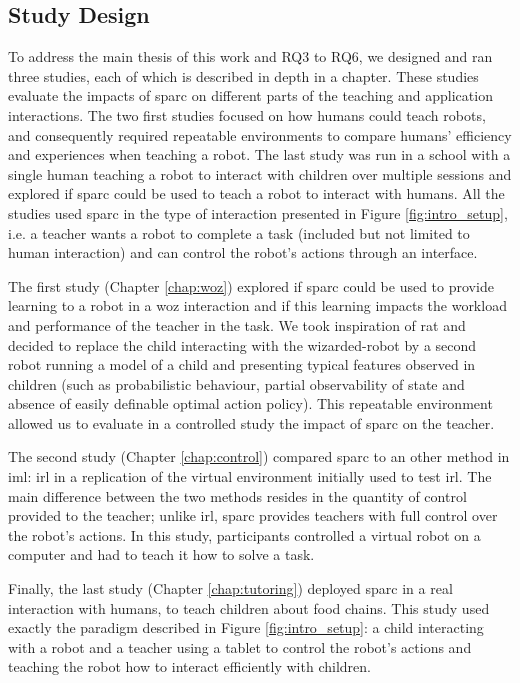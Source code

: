 \subsection{Study Design} 

To address the main thesis of this work and RQ3 to RQ6, we designed and ran three studies, each of which is described in depth in a chapter. These studies evaluate the impacts of \gls{sparc} on different parts of the teaching and application interactions. The two first studies focused on how humans could teach robots, and consequently required repeatable environments to compare humans' efficiency and experiences when teaching a robot. The last study was run in a school with a single human teaching a robot to interact with children over multiple sessions and explored if \gls{sparc} could be used to teach a robot to interact with humans. All the studies used \gls{sparc} in the type of interaction presented in Figure \ref{fig:intro_setup}, i.e. a teacher wants a robot to complete a task (included but not limited to human interaction) and can control the robot's actions through an interface. 

The first study (Chapter \ref{chap:woz}) explored if \gls{sparc} could be used to provide learning to a robot in a \gls{woz} interaction and if this learning impacts the workload and performance of the teacher in the task. We took inspiration of \gls{rat} and decided to replace the child interacting with the wizarded-robot by a second robot running a model of a child and presenting typical features observed in children (such as probabilistic behaviour, partial observability of state and absence of easily definable optimal action policy). This repeatable environment allowed us to evaluate in a controlled study the impact of \gls{sparc} on the teacher.

The second study (Chapter \ref{chap:control}) compared \gls{sparc} to an other method in \gls{iml}: \gls{irl} in a replication of the virtual environment initially used to test \gls{irl}. The main difference between the two methods resides in the quantity of control provided to the teacher; unlike \gls{irl}, \gls{sparc} provides teachers with full control over the robot's actions. In this study, participants controlled a virtual robot on a computer and had to teach it how to solve a task.

Finally, the last study (Chapter \ref{chap:tutoring}) deployed \gls{sparc} in a real interaction with humans, to teach children about food chains. This study used exactly the paradigm described in Figure \ref{fig:intro_setup}: a child interacting with a robot and a teacher using a tablet to control the robot's actions and teaching the robot how to interact efficiently with children.

